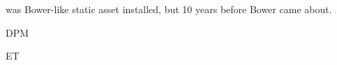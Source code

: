 \startitemize
  \item \from[pupu][P] was Bower-like static asset installed, but 10 years before Bower came about.

  \item DPM
  \item ET
\stopitemize


